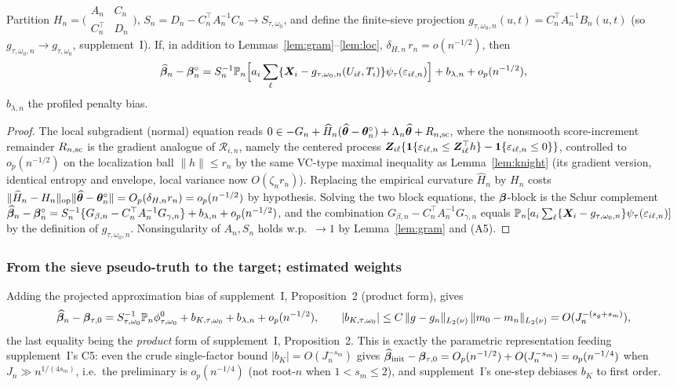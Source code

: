 \begin{lemma}\label{lem:bahadur}
Partition $H_n=\bigl(\begin{smallmatrix}A_n&C_n\\ C_n^\top&D_n\end{smallmatrix}\bigr)$,
$S_n=D_n-C_n^\top A_n^{-1}C_n\to S_{\tau,\omega_0}$, and define the finite-sieve
projection $g_{\tau,\omega_0,n}(u,t)=C_n^\top A_n^{-1}B_n(u,t)$ (so
$g_{\tau,\omega_0,n}\to g_{\tau,\omega_0}$, supplement~I). If, in addition to
Lemmas~\ref{lem:gram}--\ref{lem:loc},
$\delta_{H,n}\,r_n=o(n^{-1/2})$, then
\[
\widehat{\bm{\beta}}_n-\bm{\beta}_n^\circ=S_n^{-1}\mathbb{P}_n\Big[a_i\sum_\ell
\{\bm{X}_i-g_{\tau,\omega_0,n}(U_{i\ell},T_i)\}\psi_\tau(\varepsilon_{i\ell,n})\Big]
+b_{\lambda,n}+o_p(n^{-1/2}),
\]
$b_{\lambda,n}$ the profiled penalty bias.
\end{lemma}
\begin{proof}
The local subgradient (normal) equation reads
$0\in-G_n+\widehat H_n(\widehat{\bm{\theta}}-\bm{\theta}_n^\circ)+\Lambda_n\widehat{\bm{\theta}}
+R_{n,\rm sc}$, where the nonsmooth score-increment remainder $R_{n,\rm sc}$ is
the gradient analogue of $\mathcal R_{i,n}$, namely the centered process
$\bm{Z}_{i\ell}\{\mathbf{1}\{\varepsilon_{i\ell,n}\le\bm{Z}_{i\ell}^\top h\}
-\mathbf{1}\{\varepsilon_{i\ell,n}\le0\}\}$, controlled to $o_p(n^{-1/2})$ on the
localization ball $\|h\|\le r_n$ by the same VC-type maximal inequality as
Lemma~\ref{lem:knight} (its gradient version, identical entropy and envelope,
local variance now $O(\zeta_n r_n)$). Replacing the empirical curvature
$\widehat H_n$ by $H_n$ costs
$\|\widehat H_n-H_n\|_{\mathrm{op}}\|\widehat{\bm{\theta}}-\bm{\theta}_n^\circ\|=O_p(\delta_{H,n}r_n)
=o_p(n^{-1/2})$ by hypothesis. Solving the two block equations, the $\bm{\beta}$-block
is the Schur complement
$\widehat{\bm{\beta}}_n-\bm{\beta}_n^\circ=S_n^{-1}\{G_{\beta,n}-C_n^\top A_n^{-1}
G_{\gamma,n}\}+b_{\lambda,n}+o_p(n^{-1/2})$, and the combination
$G_{\beta,n}-C_n^\top A_n^{-1}G_{\gamma,n}$ equals
$\mathbb{P}_n[a_i\sum_\ell\{\bm{X}_i-g_{\tau,\omega_0,n}\}\psi_\tau(\varepsilon_{i\ell,n})]$ by
the definition of $g_{\tau,\omega_0,n}$. Nonsingularity of $A_n,S_n$ holds w.p.\
$\to1$ by Lemma~\ref{lem:gram} and (A5).
\end{proof}

\subsubsection{From the sieve pseudo-truth to the target; estimated weights}
\label{sec:weights}
Adding the projected approximation bias of supplement~I,
Proposition~2 (product form), gives
\[
\widehat{\bm{\beta}}_n-\bm{\beta}_{\tau,0}=S_{\tau,\omega_0}^{-1}\mathbb{P}_n\phi^0_{\tau,\omega_0}
+b_{K,\tau,\omega_0}+b_{\lambda,n}+o_p(n^{-1/2}),\qquad
|b_{K,\tau,\omega_0}|\le C\,\|g-g_{n}\|_{L_2(\nu)}\,\|m_0-m_{n}\|_{L_2(\nu)}
=O(J_n^{-(s_g+s_m)}),
\]
the last equality being the \emph{product} form of supplement~I, Proposition~2.
This is exactly the parametric representation feeding supplement~I's C5: even
the crude single-factor bound $|b_{K}|=O(J_n^{-s_m})$ gives
$\widehat{\bm{\beta}}_{\rm init}-\bm{\beta}_{\tau,0}=O_p(n^{-1/2})+O(J_n^{-s_m})=o_p(n^{-1/4})$
when $J_n\gg n^{1/(4s_m)}$, i.e.\ the preliminary is $o_p(n^{-1/4})$ (not root-$n$
when $1<s_m\le2$), and supplement~I's one-step debiases $b_{K}$ to first order.

